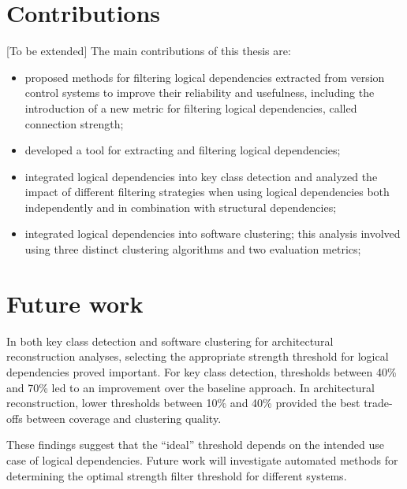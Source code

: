 \section{Contributions}

[To be extended]
\hspace{4em}The main contributions of this thesis are:  

\begin{itemize}  
    \item proposed methods for filtering logical dependencies extracted from version control systems to improve their reliability and usefulness, including the introduction of a new metric for filtering logical dependencies, called connection strength;  
    \item developed a tool for extracting and filtering logical dependencies;  
    \item integrated logical dependencies into key class detection and analyzed the impact of different filtering strategies when using logical dependencies both independently and in combination with structural dependencies;  
    \item integrated logical dependencies into software clustering; this analysis involved using three distinct clustering algorithms and two evaluation metrics;  
\end{itemize}  

\section{Future work}

\hspace{4em}In both key class detection and software clustering for architectural reconstruction analyses, selecting the appropriate strength threshold for logical dependencies proved important. For key class detection, thresholds between 40\% and 70\% led to an improvement over the baseline approach. In architectural reconstruction, lower thresholds between 10\% and 40\% provided the best trade-offs between coverage and clustering quality. 

These findings suggest that the “ideal” threshold depends on the intended use case of logical dependencies. Future work will investigate automated methods for determining the optimal strength filter threshold for different systems.
